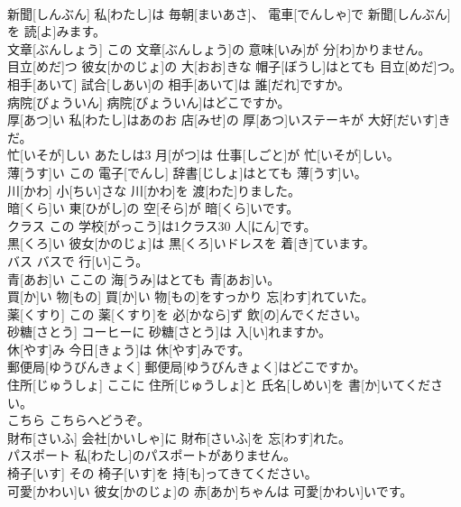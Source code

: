 \documentclass[8pt]{extreport}
\begin{document}
\begin{CJK}{UTF8}{min}
\\	新聞[しんぶん]	私[わたし]は 毎朝[まいあさ]、 電車[でんしゃ]で 新聞[しんぶん]を 読[よ]みます。		
\\	文章[ぶんしょう]	この 文章[ぶんしょう]の 意味[いみ]が 分[わ]かりません。		
\\	目立[めだ]つ	彼女[かのじょ]の 大[おお]きな 帽子[ぼうし]はとても 目立[めだ]つ。		
\\	相手[あいて]	試合[しあい]の 相手[あいて]は 誰[だれ]ですか。		
\\	病院[びょういん]	病院[びょういん]はどこですか。		
\\	厚[あつ]い	私[わたし]はあのお 店[みせ]の 厚[あつ]いステーキが 大好[だいす]きだ。		
\\	忙[いそが]しい	あたしは3 月[がつ]は 仕事[しごと]が 忙[いそが]しい。		
\\	薄[うす]い	この 電子[でんし] 辞書[じしょ]はとても 薄[うす]い。		
\\	川[かわ]	小[ちい]さな 川[かわ]を 渡[わた]りました。		
\\	暗[くら]い	東[ひがし]の 空[そら]が 暗[くら]いです。		
\\	クラス	この 学校[がっこう]は1クラス30 人[にん]です。		
\\	黒[くろ]い	彼女[かのじょ]は 黒[くろ]いドレスを 着[き]ています。		
\\	バス	バスで 行[い]こう。		
\\	青[あお]い	ここの 海[うみ]はとても 青[あお]い。		
\\	買[か]い 物[もの]	買[か]い 物[もの]をすっかり 忘[わす]れていた。		
\\	薬[くすり]	この 薬[くすり]を 必[かなら]ず 飲[の]んでください。		
\\	砂糖[さとう]	コーヒーに 砂糖[さとう]は 入[い]れますか。		
\\	休[やす]み	今日[きょう]は 休[やす]みです。		
\\	郵便局[ゆうびんきょく]	郵便局[ゆうびんきょく]はどこですか。		
\\	住所[じゅうしょ]	ここに 住所[じゅうしょ]と 氏名[しめい]を 書[か]いてください。		
\\	こちら	こちらへどうぞ。		
\\	財布[さいふ]	会社[かいしゃ]に 財布[さいふ]を 忘[わす]れた。		
\\	パスポート	私[わたし]のパスポートがありません。		
\\	椅子[いす]	その 椅子[いす]を 持[も]ってきてください。		
\\	可愛[かわい]い	彼女[かのじょ]の 赤[あか]ちゃんは 可愛[かわい]いです。		

\end{CJK}
\end{document}
